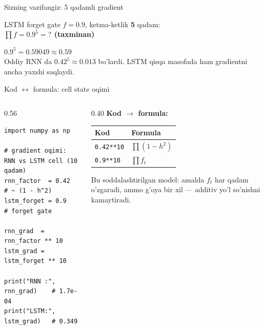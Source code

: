 \documentclass[aspectratio=169,11pt]{beamer}
\begin{document}
\begin{frame}{Sizning vazifangiz: 5 qadamli gradient}
  \begin{tcolorbox}[warnbox,title=Savol --- 60 soniya]
    \small
    LSTM forget gate $f=0.9$, ketma-ketlik \textbf{5} qadam:\\[4pt]
    \textbf{\large $\prod f = 0.9^5 = ?$ \quad (taxminan)}
  \end{tcolorbox}
  \pause
  \begin{tcolorbox}[okbox,title=Javob]
    \small
    $0.9^5 = 0.59049 \approx \mathbf{0.59}$\\[3pt]
    \footnotesize Oddiy RNN da $0.42^5\approx 0.013$ bo'lardi. LSTM qisqa masofada
    ham gradientni ancha yaxshi saqlaydi.
  \end{tcolorbox}
\end{frame}

\begin{frame}[fragile]{Kod $\leftrightarrow$ formula: cell state oqimi}
  \begin{columns}[T]
    \begin{column}{0.56\textwidth}
\begin{lstlisting}
import numpy as np

# gradient oqimi: RNN vs LSTM cell (10 qadam)
rnn_factor  = 0.42      # ~ (1 - h^2)
lstm_forget = 0.9       # forget gate

rnn_grad  = rnn_factor ** 10
lstm_grad = lstm_forget ** 10

print("RNN :", rnn_grad)    # 1.7e-04
print("LSTM:", lstm_grad)   # 0.349
\end{lstlisting}
    \end{column}
    \begin{column}{0.40\textwidth}
      \textbf{Kod $\to$ formula:}\\[3pt]
      \footnotesize
      \begin{tabular}{p{1.9cm}p{2.1cm}}
        \toprule
        Kod & Formula \\
        \midrule
        \texttt{0.42**10} & $\prod(1-h^2)$ \\
        \texttt{0.9**10} & $\prod f_t$ \\
        \bottomrule
      \end{tabular}
      \vspace{4pt}
      \begin{tcolorbox}[warnbox,top=2pt,bottom=2pt]
        \footnotesize
        Bu soddalashtirilgan model: amalda $f_t$ har qadam o'zgaradi, ammo g'oya
        bir xil --- additiv yo'l so'nishni kamaytiradi.
      \end{tcolorbox}
    \end{column}
  \end{columns}
\end{frame}
\end{document}
